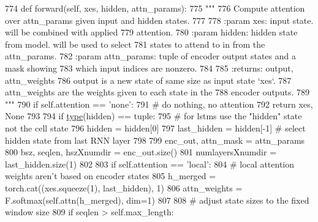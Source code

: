 \begin{DoxyCode}
774     \textcolor{keyword}{def }forward(self, xes, hidden, attn\_params):
775         \textcolor{stringliteral}{"""}
776 \textcolor{stringliteral}{        Compute attention over attn\_params given input and hidden states.}
777 \textcolor{stringliteral}{}
778 \textcolor{stringliteral}{        :param xes:         input state. will be combined with applied}
779 \textcolor{stringliteral}{                            attention.}
780 \textcolor{stringliteral}{        :param hidden:      hidden state from model. will be used to select}
781 \textcolor{stringliteral}{                            states to attend to in from the attn\_params.}
782 \textcolor{stringliteral}{        :param attn\_params: tuple of encoder output states and a mask showing}
783 \textcolor{stringliteral}{                            which input indices are nonzero.}
784 \textcolor{stringliteral}{}
785 \textcolor{stringliteral}{        :returns: output, attn\_weights}
786 \textcolor{stringliteral}{                  output is a new state of same size as input state `xes`.}
787 \textcolor{stringliteral}{                  attn\_weights are the weights given to each state in the}
788 \textcolor{stringliteral}{                  encoder outputs.}
789 \textcolor{stringliteral}{        """}
790         \textcolor{keywordflow}{if} self.attention == \textcolor{stringliteral}{'none'}:
791             \textcolor{comment}{# do nothing, no attention}
792             \textcolor{keywordflow}{return} xes, \textcolor{keywordtype}{None}
793 
794         \textcolor{keywordflow}{if} \hyperlink{namespaceparlai_1_1agents_1_1tfidf__retriever_1_1build__tfidf_ad5dfae268e23f506da084a9efb72f619}{type}(hidden) == tuple:
795             \textcolor{comment}{# for lstms use the "hidden" state not the cell state}
796             hidden = hidden[0]
797         last\_hidden = hidden[-1]  \textcolor{comment}{# select hidden state from last RNN layer}
798 
799         enc\_out, attn\_mask = attn\_params
800         bsz, seqlen, hszXnumdir = enc\_out.size()
801         numlayersXnumdir = last\_hidden.size(1)
802 
803         \textcolor{keywordflow}{if} self.attention == \textcolor{stringliteral}{'local'}:
804             \textcolor{comment}{# local attention weights aren't based on encoder states}
805             h\_merged = torch.cat((xes.squeeze(1), last\_hidden), 1)
806             attn\_weights = F.softmax(self.attn(h\_merged), dim=1)
807 
808             \textcolor{comment}{# adjust state sizes to the fixed window size}
809             \textcolor{keywordflow}{if} seqlen > self.max\_length:

\end{DoxyCode}

